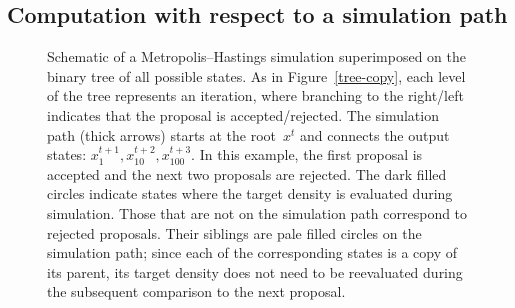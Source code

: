 \documentclass[angelino.tex]{subfiles}
\begin{document}
\subsection{Computation with respect to a simulation path}

\begin{figure}[t!]
  \centering%
  \caption{Schematic of a Metropolis--Hastings simulation superimposed on the
  binary tree of all possible states. 
  As in Figure~\ref{tree-copy}, each level of the tree represents an iteration,
  where branching to the right/left 
  indicates that the proposal is accepted/rejected.
  The simulation path (thick arrows) starts at the root~$x^t$
  and connects the output states: $x_1^{t+1}, x_{10}^{t+2}, x_{100}^{t+3}$.
  In this example, the first proposal is accepted and
  the next two proposals are rejected.  
  The dark filled circles indicate states where the target density
  is evaluated during simulation.
  Those that are not on the simulation path correspond to rejected proposals.
  Their siblings are pale filled circles on the simulation path;
  since each of the corresponding states is a copy of its parent,
  its target density does not need to be reevaluated during the subsequent
  comparison to the next proposal.}
  \label{tree-chain}
\end{figure}
\end{document}
